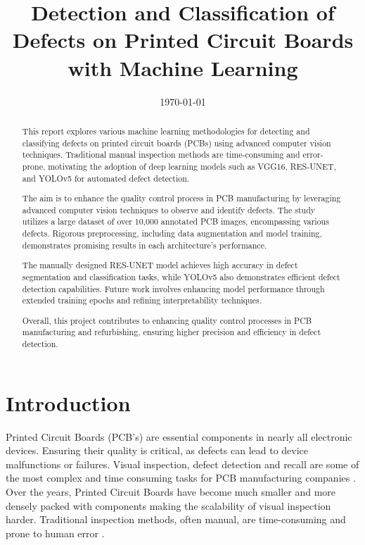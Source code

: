 \documentclass[12pt]{article}
\title{Detection and Classification of Defects on Printed Circuit Boards with Machine Learning\\\phantom{.}}
\date{\today}
\begin{document}
\thispagestyle{empty}
\maketitle
\thispagestyle{empty}

\tableofcontents
\thispagestyle{empty}

\clearpage
\newpage

\vspace{2.5cm}

\begin{abstract}
This report explores various machine learning methodologies for detecting and classifying defects on printed circuit boards (PCBs) using advanced computer vision techniques. Traditional manual inspection methods are time-consuming and error-prone, motivating the adoption of deep learning models such as VGG16\cite{VGG16GitHub}, RES-UNET\cite{Ashraf2022}, and YOLOv5\cite{YOLOv5GitHub} for automated defect detection.

The aim is to enhance the quality control process in PCB manufacturing by leveraging advanced computer vision techniques to observe and identify defects. The study utilizes a large dataset of over 10,000 annotated PCB images, encompassing various defects. Rigorous preprocessing, including data augmentation and model training, demonstrates promising results in each architecture's performance.

The manually designed RES-UNET model achieves high accuracy in defect segmentation and classification tasks, while YOLOv5 also demonstrates efficient defect detection capabilities. Future work involves enhancing model performance through extended training epochs and refining interpretability techniques.

Overall, this project contributes to enhancing quality control processes in PCB manufacturing and refurbishing, ensuring higher precision and efficiency in defect detection.

\end{abstract}

\clearpage
\newpage

\section{Introduction}

Printed Circuit Boards (PCB's) are essential components in nearly all electronic devices. Ensuring their quality is critical, as defects can lead to device malfunctions or failures. Visual inspection, defect detection and recall are some of the most complex and time consuming tasks for PCB manufacturing companies \cite{wevolver_pcb_inspection}. Over the years, Printed Circuit Boards have become much smaller and more densely packed with components making the scalability of visual inspection harder. Traditional inspection methods, often manual, are time-consuming and prone to human error \cite{wevolver_pcb_inspection}.
\end{document}

